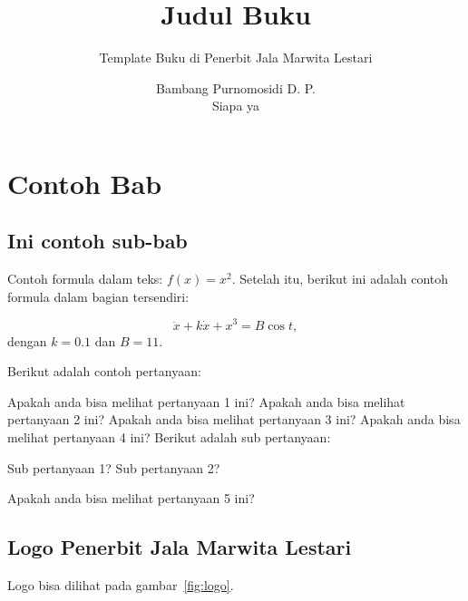 \documentclass[oneside,a4paper,11pt,explicit]{book}
\title{Judul Buku}
\subtitle{Template Buku di Penerbit Jala Marwita Lestari}
\author{
  Bambang Purnomosidi D. P.\\Siapa ya
}
\begin{document}
\pagestyle{empty}
\maketitle
\hakcipta
\tableofcontents
{}
\listoffigures
{}
\listoftables
{}
\lstlistoflistings
\newpage
{}
\pagestyle{fancy}

\chapter{Contoh Bab}
\lipsum[1]

\section{Ini contoh sub-bab}
\lipsum[2]

Contoh formula dalam teks: $f(x) = x^2$. Setelah itu, berikut ini adalah contoh formula dalam bagian tersendiri:

\begin{equation}
\ddot{x}+k\dot{x}+x^3=B\cos t,
\end{equation}
dengan $k=0.1$ dan $B=11$. 

Berikut adalah contoh pertanyaan:

\begin{questions}
\question Apakah anda bisa melihat pertanyaan 1 ini?
\question Apakah anda bisa melihat pertanyaan 2 ini?
\question Apakah anda bisa melihat pertanyaan 3 ini?
\question Apakah anda bisa melihat pertanyaan 4 ini?
\question Berikut adalah sub pertanyaan:
\begin{tasks}
\task Sub pertanyaan 1?
\task Sub pertanyaan 2?
\end{tasks}
\question Apakah anda bisa melihat pertanyaan 5 ini?
\end{questions}

\section{Logo Penerbit Jala Marwita Lestari}
\lipsum[3] Logo bisa dilihat pada gambar~\ref{fig:logo}.
\end{document}

